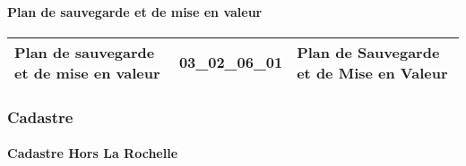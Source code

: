 \documentclass[12pt,titlepage]{book}
\begin{document}
\paragraph{Plan de sauvegarde et de mise en valeur}
\noindent
\vspace{\baselineskip}

\renewcommand{\arraystretch}{1.2}
\begin{supertabular}{|p{10cm}|c|p{15cm}|}
 Plan de sauvegarde et de mise en valeur & 03\_02\_06\_01 & Plan de Sauvegarde et de Mise en Valeur\\
\hline
\end{supertabular}

\subsubsection{\large Cadastre}
\paragraph{Cadastre Hors La Rochelle}
\noindent
\vspace{\baselineskip}
\end{document}
